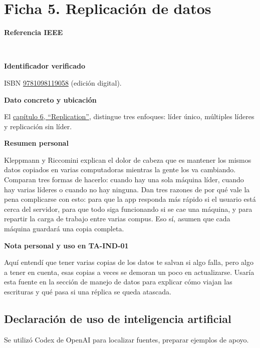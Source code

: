 \documentclass[11pt,a4paper]{article}
\newcommand{\ficha}[6]{%
  \section*{\color{tinta}#1}
  \textbf{Referencia IEEE}\par
  \cite{#2}\ \fullcite{#2}\par
  \textbf{Identificador verificado}\par
  #3\par
  \textbf{Dato concreto y ubicación}\par
  #4\par
  \textbf{Resumen personal}\par\nopagebreak[4]
  #5\par
  \textbf{Nota personal y uso en TA-IND-01}\par\nopagebreak[4]
  #6\par
}
\begin{document}
\ficha{Ficha 5. Replicación de datos}{kleppmann2026}
  {ISBN \href{https://www.oreilly.com/library/view/designing-data-intensive/9781098119058/}{9781098119058} (edición digital).}
  {El \href{https://www.oreilly.com/library/view/designing-data-intensive-applications/9781098119058/ch06.html}{capítulo 6, ``Replication''}, distingue tres enfoques: líder único, múltiples líderes y replicación sin líder.}
  {Kleppmann y Riccomini explican el dolor de cabeza que es mantener los mismos datos copiados en varias computadoras mientras la gente los va cambiando. Comparan tres formas de hacerlo: cuando hay una sola máquina líder, cuando hay varias líderes o cuando no hay ninguna. Dan tres razones de por qué vale la pena complicarse con esto: para que la app responda más rápido si el usuario está cerca del servidor, para que todo siga funcionando si se cae una máquina, y para repartir la carga de trabajo entre varias compus. Eso sí, asumen que cada máquina guardará una copia completa.}
  {Aquí entendí que tener varias copias de los datos te salvan si algo falla, pero algo a tener en cuenta, esas copias a veces se demoran un poco en actualizarse. Usaría esta fuente en la sección de manejo de datos para explicar cómo viajan las escrituras y qué pasa si una réplica se queda atascada.}

\subsection*{Declaración de uso de inteligencia artificial}
Se utilizó Codex de OpenAI para localizar fuentes, preparar ejemplos de apoyo.
\end{document}
